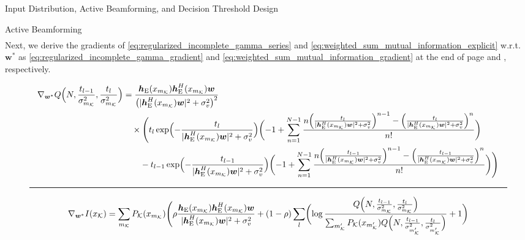 \documentclass[journal]{IEEEtran}
\begin{document}
\begin{section}{Input Distribution, Active Beamforming, and Decision Threshold Design}
\begin{subsection}{Active Beamforming}
\begin{align}
			\label{eq:regularized_incomplete_gamma_series}
		\end{align}
		Next, we derive the gradients of \eqref{eq:regularized_incomplete_gamma_series} and \eqref{eq:weighted_sum_mutual_information_explicit} w.r.t. $\boldsymbol{w}^*$ as \eqref{eq:regularized_incomplete_gamma_gradient} and \eqref{eq:weighted_sum_mutual_information_gradient} at the end of page \pageref{eq:regularized_incomplete_gamma_gradient} and \pageref{eq:weighted_sum_mutual_information_gradient}, respectively.
		\begin{figure*}[!b]
			\begin{align}
				\nabla_{\boldsymbol{w}^*} Q\Bigl(N,\frac{t_{l-1}}{\sigma_{m_{\mathcal{K}}}^2},\frac{t_l}{\sigma_{m_{\mathcal{K}}}^2}\Bigr)
				 & = \frac{\boldsymbol{h}_{\mathrm{E}}(x_{m_{\mathcal{K}}})\boldsymbol{h}_{\mathrm{E}}^H(x_{m_{\mathcal{K}}})\boldsymbol{w}}{\bigl(\lvert\boldsymbol{h}_{\mathrm{E}}^H(x_{m_{\mathcal{K}}})\boldsymbol{w}\rvert^2+\sigma_v^2\bigr)^2}\nonumber                                                                                                                                                                                                        \\
				 & \quad \times \Biggl(t_l\exp\Bigl(-\frac{t_l}{\lvert\boldsymbol{h}_{\mathrm{E}}^H(x_{m_{\mathcal{K}}})\boldsymbol{w}\rvert^2+\sigma_v^2}\Bigr)\biggl(-1+\sum_{n=1}^{N-1} \frac{n\Bigl(\frac{t_l}{\lvert\boldsymbol{h}_{\mathrm{E}}^H(x_{m_{\mathcal{K}}})\boldsymbol{w}\rvert^2+\sigma_v^2}\Bigr)^{n-1}-\Bigl(\frac{t_l}{\lvert\boldsymbol{h}_{\mathrm{E}}^H(x_{m_{\mathcal{K}}})\boldsymbol{w}\rvert^2+\sigma_v^2}\Bigr)^n}{n!}\biggr)\nonumber    \\
				 & \qquad - t_{l-1}\exp\Bigl(-\frac{t_{l-1}}{\lvert\boldsymbol{h}_{\mathrm{E}}^H(x_{m_{\mathcal{K}}})\boldsymbol{w}\rvert^2+\sigma_v^2}\Bigr)\biggl(-1+\sum_{n=1}^{N-1} \frac{n\Bigl(\frac{t_{l-1}}{\lvert\boldsymbol{h}_{\mathrm{E}}^H(x_{m_{\mathcal{K}}})\boldsymbol{w}\rvert^2+\sigma_v^2}\Bigr)^{n-1}-\Bigl(\frac{t_{l-1}}{\lvert\boldsymbol{h}_{\mathrm{E}}^H(x_{m_{\mathcal{K}}})\boldsymbol{w}\rvert^2+\sigma_v^2}\Bigr)^n}{n!}\biggr)\Biggr)
				\label{eq:regularized_incomplete_gamma_gradient}
			\end{align}
		\end{figure*}
		\begin{figure*}[!b]
			\hrule
			\begin{align}
				\nabla_{\boldsymbol{w}^*} I(x_{\mathcal{K}})
				 & = \sum_{m_{\mathcal{K}}}P_{\mathcal{K}}(x_{m_{\mathcal{K}}})\Biggl(\rho\frac{\boldsymbol{h}_{\mathrm{E}}(x_{m_{\mathcal{K}}})\boldsymbol{h}_{\mathrm{E}}^H(x_{m_{\mathcal{K}}})\boldsymbol{w}}{\lvert\boldsymbol{h}_{\mathrm{E}}^H(x_{m_{\mathcal{K}}})\boldsymbol{w}\rvert^2+\sigma_v^2}+(1-\rho)\sum_l\biggl(\log\frac{Q\Bigl(N,\frac{t_{l-1}}{\sigma_{m_{\mathcal{K}}}^2},\frac{t_l}{\sigma_{m_{\mathcal{K}}}^2}\Bigr)}{\sum_{m_{\mathcal{K}}'}P_{\mathcal{K}}(x_{m_{\mathcal{K}}'})Q\Bigl(N,\frac{t_{l-1}}{\sigma_{m_{\mathcal{K}}'}^2},\frac{t_l}{\sigma_{m_{\mathcal{K}}'}^2}\Bigr)}+1\biggr)\nonumber   \\

\end{align}
\end{figure*}
\end{subsection}
\end{section}
\end{document}
